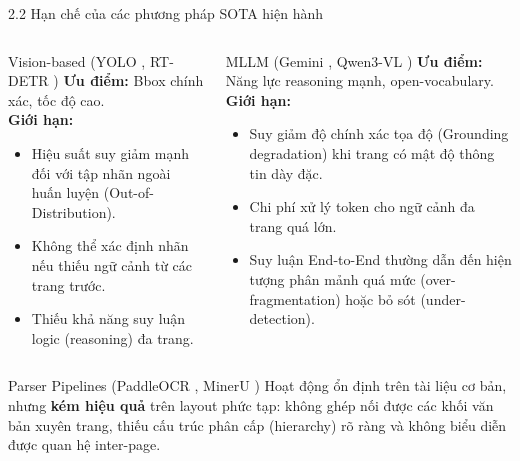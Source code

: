 \documentclass[aspectratio=1610,8pt]{beamer}
\begin{document}
\begin{frame}{2.2 \; Hạn chế của các phương pháp SOTA hiện hành}
    \begin{columns}[T]
        \begin{block}{\color{dangerred} Vision-based (YOLO \cite{dla_2024_arxiv_doclayout_yolo_enhancing_document_layout_analysis_through_diverse_syn}, RT-DETR \cite{zhao2023detrs})}
            \textbf{Ưu điểm:} Bbox chính xác, tốc độ cao.\\
            \textbf{Giới hạn:}
            \begin{itemize}
                \item Hiệu suất suy giảm mạnh đối với tập nhãn ngoài huấn luyện (Out-of-Distribution).
                \item Không thể xác định nhãn nếu thiếu ngữ cảnh từ các trang trước.
                \item Thiếu khả năng suy luận logic (reasoning) đa trang.
            \end{itemize}
        \end{block}

        \begin{block}{\color{dangerred} MLLM (Gemini \cite{gemini_team_2024_gemini}, Qwen3-VL \cite{qwen_team_2025_qwen3vl_thinking})}
            \textbf{Ưu điểm:} Năng lực reasoning mạnh, open-vocabulary.\\
            \textbf{Giới hạn:}
            \begin{itemize}
                \item Suy giảm độ chính xác tọa độ (Grounding degradation) khi trang có mật độ thông tin dày đặc.
                \item Chi phí xử lý token cho ngữ cảnh đa trang quá lớn.
                \item Suy luận End-to-End thường dẫn đến hiện tượng phân mảnh quá mức (over-fragmentation) hoặc bỏ sót (under-detection).
            \end{itemize}
        \end{block}
    \end{columns}

    \vspace{0.4em}
    \begin{block}{\color{dangerred} Parser Pipelines (PaddleOCR \cite{du2020ppocr}, MinerU \cite{wang2024mineru})}
        Hoạt động ổn định trên tài liệu cơ bản, nhưng \textbf{kém hiệu quả} trên layout phức tạp: không ghép nối được các khối văn bản xuyên trang, thiếu cấu trúc phân cấp (hierarchy) rõ ràng và không biểu diễn được quan hệ inter-page.
    \end{block}
\end{frame}
\end{document}

